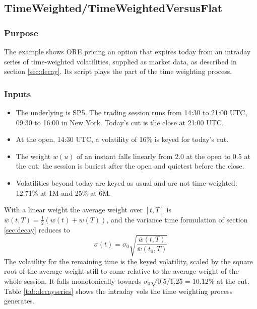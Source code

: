 \documentclass[12pt, a4paper]{article}
\begin{document}
\subsection{TimeWeighted/TimeWeightedVersusFlat}\label{sec:ex-decay}

\subsubsection*{Purpose}

The example shows ORE pricing an option that expires today from an intraday series of time-weighted volatilities, supplied
as market data, as described in section \ref{sec:decay}. Its script plays the part of the time weighting process.

\subsubsection*{Inputs}

\begin{itemize}
\item The underlying is SP5. The trading session runs from 14:30 to 21:00 UTC, 09:30 to 16:00 in New York. Today's cut
  is the close at 21:00 UTC.
\item At the open, 14:30 UTC, a volatility of 16\% is keyed for today's cut.
\item The weight $w(u)$ of an instant falls linearly from 2.0 at the open to 0.5 at the cut: the session is busiest
  after the open and quietest before the close.
\item Volatilities beyond today are keyed as usual and are not time-weighted: 12.71\% at 1M and 25\% at 6M.
\end{itemize}

With a linear weight the average weight over $[t, T]$ is $\bar w(t, T) = \frac{1}{2}\left(w(t) + w(T)\right)$, and the
variance time formulation of section \ref{sec:decay} reduces to
\begin{equation}
\sigma(t) = \sigma_0 \sqrt{\frac{\bar w(t, T)}{\bar w(t_0, T)}}
\end{equation}
The volatility for the remaining time is the keyed volatility, scaled by the square root of the average weight still
to come relative to the average weight of the whole session. It falls monotonically towards
$\sigma_0\sqrt{0.5/1.25} = 10.12\%$ at the cut. Table \ref{tab:decayseries} shows the intraday vols the time weighting process
generates.
\end{document}
